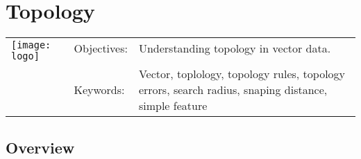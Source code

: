 

\section{Topology}\label{sec:topology}
\begin{tabular}{p{3.5cm}p{6cm}p{6cm}}
\multirow{2}{*}{\texttt{[image: logo]}} & Objectives: &
Understanding topology in vector data. \\
& & \\
& Keywords: & 
Vector, toplology, topology rules, topology errors, search radius, snaping
distance, simple feature  \\
\hline
\end{tabular}

\subsection{Overview}\label{subsec:overview}





